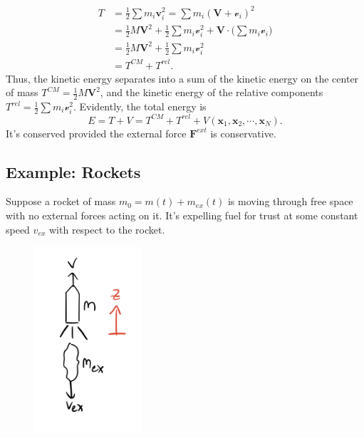 \documentclass[
  letterpaper,
  DIV=11,
  numbers=noendperiod]{scrreprt}
\begin{document}
\[
\begin{align*}
T &= \frac{1}{2}\sum m_i \mathbf{v}_i^2 = \sum m_i (\mathbf{V} + \boldsymbol{\mathscr{v}}_i)^2 \\
&= \frac{1}{2}M\mathbf{V}^2 + \frac{1}{2}\sum m_i\boldsymbol{\mathscr{v}}_i^2 + \mathbf{V} \cdot \bigg(\sum m_i \boldsymbol{\mathscr{v}}_i\bigg) \\
&= \frac{1}{2}M\mathbf{V}^2 + \frac{1}{2}\sum m_i\boldsymbol{\mathscr{v}}_i^2 \\
&= T^{CM} + T^{rel}.
\end{align*}
\] Thus, the kinetic energy separates into a sum of the kinetic energy
on the center of mass \(T^{CM} = \frac{1}{2}M\mathbf{V}^2\), and the
kinetic energy of the relative components
\(T^{rel} = \frac{1}{2}\sum m_i\boldsymbol{\mathscr{v}}_i^2\).
Evidently, the total energy is \[
E = T + V = T^{CM} + T^{rel} + V(\mathbf{x}_1, \mathbf{x}_2, \cdots, \mathbf{x}_N).
\] It's conserved provided the external force \(\mathbf{F}^{ext}\) is
conservative.

\hypertarget{example-rockets}{%
\subsection{Example: Rockets}\label{example-rockets}}

Suppose a rocket of mass \(m_0=m(t) + m_{ex}(t)\) is moving through free
space with no external forces acting on it. It's expelling fuel for
trust at some constant speed \(v_{ex}\) with respect to the rocket.

\begin{figure}

{\centering \includegraphics[width=1.5625in,height=\textheight]{classical-mechanics/./resources/image-20230212033930176.png}

}

\end{figure}
\end{document}
